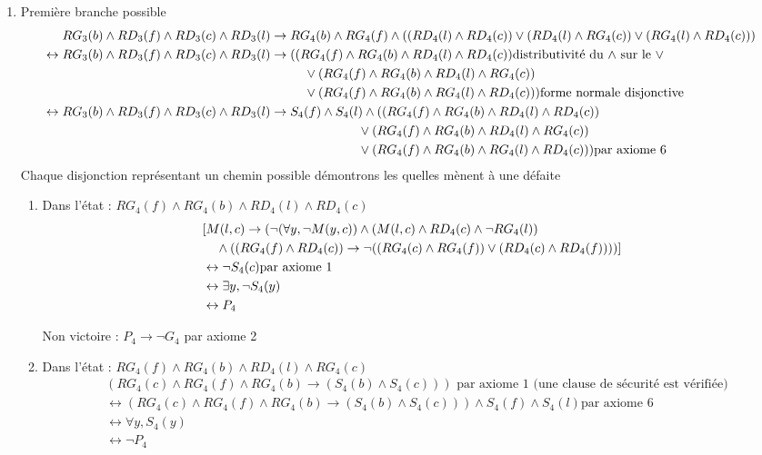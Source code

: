 \documentclass{article}
\begin{document}
\begin{enumerate}
  \item Première branche possible
\begin{align*}
      RG_3(b) \wedge RD_3(f) \wedge RD_3(c) \wedge RD_3(l)&\to RG_4(b) \wedge RG_4(f) \wedge ((RD_4(l)\wedge RD_4(c))\vee (RD_4(l)\wedge RG_4(c))\vee(RG_4(l)\wedge RD_4(c)))\\
      \leftrightarrow RG_3(b) \wedge RD_3(f) \wedge RD_3(c) \wedge RD_3(l) &\to (( RG_4(f) \wedge RG_4(b) \wedge RD_4(l) \wedge RD_4(c))\text{distributivité du $\wedge$ sur le $\vee$}\\
      & \hphantom{aaaaa} \vee (RG_4(f) \wedge RG_4(b) \wedge RD_4(l) \wedge RG_4(c))\\
      & \hphantom{aaaaa} \vee (RG_4(f) \wedge RG_4(b) \wedge RG_4(l) \wedge RD_4(c)))\text{forme normale disjonctive}\\
      \leftrightarrow RG_3(b) \wedge RD_3(f) \wedge RD_3(c) \wedge RD_3(l) &\to S_4(f) \wedge S_4(l) \wedge (( RG_4(f) \wedge RG_4(b) \wedge RD_4(l) \wedge RD_4(c))\\
      & \hphantom{aaaaaaaaaaaaa} \vee (RG_4(f) \wedge RG_4(b) \wedge RD_4(l) \wedge RG_4(c))\\
      & \hphantom{aaaaaaaaaaaaa} \vee (RG_4(f) \wedge RG_4(b) \wedge RG_4(l) \wedge RD_4(c)))\text{par axiome 6}\\
\end{align*}
Chaque disjonction représentant un chemin possible démontrons les quelles mènent à une défaite
  \begin{enumerate}
    \item Dans l'état : $RG_4(f) \wedge RG_4(b) \wedge RD_4(l) \wedge RD_4(c)$
    \begin{align*}
      &[M(l,c) \to (\neg(\forall y, \neg M(y,c))\wedge (M(l,c)\wedge RD_4(c)\wedge \neg RG_4(l)) \\
      &\hphantom{aa}  \wedge ((RG_4(f) \wedge RD_4(c))\to \neg ((RG_4(c) \wedge RG_4(f))\vee (RD_4(c)\wedge RD_4(f))))]\\
      &\leftrightarrow \neg S_4(c) \text{par axiome 1}\\
      &\leftrightarrow \exists y,\neg S_4(y)\\
      &\leftrightarrow P_4
    \end{align*}

    Non victoire : $P_4 \to \neg G_4$ par axiome 2
    \item Dans l'état : $RG_4(f) \wedge RG_4(b) \wedge RD_4(l) \wedge RG_4(c)$
    \begin{align*}
      &(RG_4(c)\wedge RG_4(f)\wedge RG_4(b) \to (S_4(b) \wedge S_4(c))) \text{ par axiome 1 (une clause de sécurité est vérifiée)}\\
      &\leftrightarrow (RG_4(c)\wedge RG_4(f)\wedge RG_4(b) \to (S_4(b) \wedge S_4(c))) \wedge S_4(f) \wedge S_4(l)\text{par axiome 6}\\
      &\leftrightarrow \forall y,S_4(y)\\
      &\leftrightarrow \neg P_4
    \end{align*}


\end{enumerate}
\end{enumerate}
\end{document}
